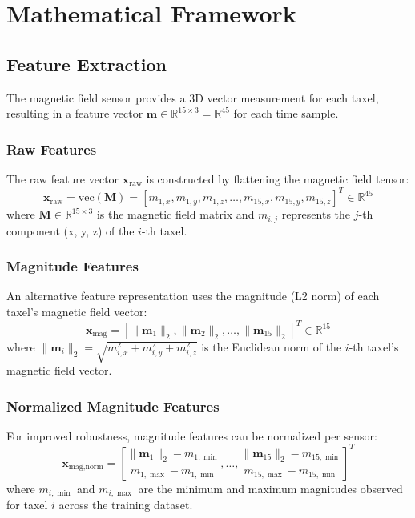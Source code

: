 \documentclass[11pt,a4paper]{article}
\begin{document}
\section{Mathematical Framework}

\subsection{Feature Extraction}

The magnetic field sensor provides a 3D vector measurement for each taxel, resulting in a feature vector $\mathbf{m} \in \mathbb{R}^{15 \times 3} = \mathbb{R}^{45}$ for each time sample.

\subsubsection{Raw Features}

The raw feature vector $\mathbf{x}_{\text{raw}}$ is constructed by flattening the magnetic field tensor:
\begin{equation}
\mathbf{x}_{\text{raw}} = \text{vec}(\mathbf{M}) = [m_{1,x}, m_{1,y}, m_{1,z}, \ldots, m_{15,x}, m_{15,y}, m_{15,z}]^T \in \mathbb{R}^{45}
\end{equation}
where $\mathbf{M} \in \mathbb{R}^{15 \times 3}$ is the magnetic field matrix and $m_{i,j}$ represents the $j$-th component (x, y, z) of the $i$-th taxel.

\subsubsection{Magnitude Features}

An alternative feature representation uses the magnitude (L2 norm) of each taxel's magnetic field vector:
\begin{equation}
\mathbf{x}_{\text{mag}} = [\|\mathbf{m}_1\|_2, \|\mathbf{m}_2\|_2, \ldots, \|\mathbf{m}_{15}\|_2]^T \in \mathbb{R}^{15}
\end{equation}
where $\|\mathbf{m}_i\|_2 = \sqrt{m_{i,x}^2 + m_{i,y}^2 + m_{i,z}^2}$ is the Euclidean norm of the $i$-th taxel's magnetic field vector.

\subsubsection{Normalized Magnitude Features}

For improved robustness, magnitude features can be normalized per sensor:
\begin{equation}
\mathbf{x}_{\text{mag,norm}} = \left[\frac{\|\mathbf{m}_1\|_2 - m_{1,\min}}{m_{1,\max} - m_{1,\min}}, \ldots, \frac{\|\mathbf{m}_{15}\|_2 - m_{15,\min}}{m_{15,\max} - m_{15,\min}}\right]^T
\end{equation}
where $m_{i,\min}$ and $m_{i,\max}$ are the minimum and maximum magnitudes observed for taxel $i$ across the training dataset.
\end{document}
